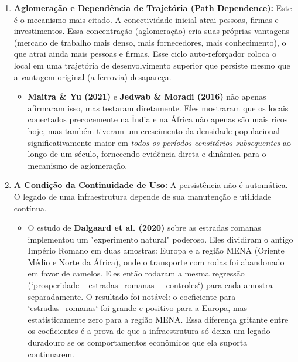 \documentclass[12pt, a4paper]{article}
\begin{document}
\begin{enumerate}[label=\arabic*.]
    \item \textbf{Aglomeração e Dependência de Trajetória (Path Dependence):} Este é o mecanismo mais citado. A conectividade inicial atrai pessoas, firmas e investimentos. Essa concentração (aglomeração) cria suas próprias vantagens (mercado de trabalho mais denso, mais fornecedores, mais conhecimento), o que atrai ainda mais pessoas e firmas. Esse ciclo auto-reforçador coloca o local em uma trajetória de desenvolvimento superior que persiste mesmo que a vantagem original (a ferrovia) desapareça.
    
    \begin{itemize}
        \item  \textbf{Maitra \& Yu (2021)} e \textbf{Jedwab \& Moradi (2016)} não apenas afirmaram isso, mas testaram diretamente. Eles mostraram que os locais conectados precocemente na Índia e na África não apenas são mais ricos hoje, mas também tiveram um crescimento da densidade populacional significativamente maior em \textit{todos os períodos censitários subsequentes} ao longo de um século, fornecendo evidência direta e dinâmica para o mecanismo de aglomeração.
    \end{itemize}

    \item \textbf{A Condição da Continuidade de Uso:} A persistência não é automática. O legado de uma infraestrutura depende de sua manutenção e utilidade contínua.
    
    \begin{itemize}
        \item  O estudo de \textbf{Dalgaard et al. (2020)} sobre as estradas romanas implementou um "experimento natural" poderoso. Eles dividiram o antigo Império Romano em duas amostras: Europa e a região MENA (Oriente Médio e Norte da África), onde o transporte com rodas foi abandonado em favor de camelos. Eles então rodaram a mesma regressão (`prosperidade ~ estradas\_romanas + controles`) para cada amostra separadamente. O resultado foi notável: o coeficiente para `estradas\_romanas` foi grande e positivo para a Europa, mas estatisticamente zero para a região MENA. Essa diferença gritante entre os coeficientes é a prova de que a infraestrutura só deixa um legado duradouro se os comportamentos econômicos que ela suporta continuarem.
    \end{itemize}
    

\end{enumerate}
\end{document}
